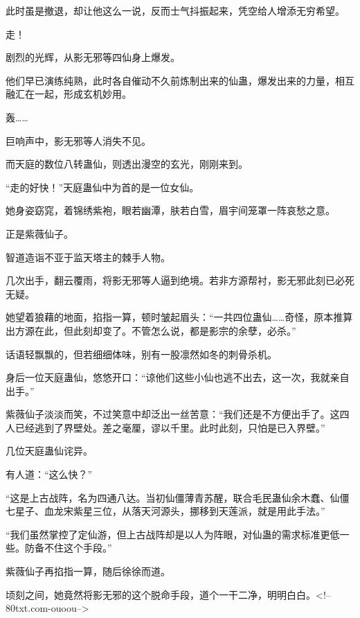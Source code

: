 \begin{this_body}
此时虽是撤退，却让他这么一说，反而士气抖振起来，凭空给人增添无穷希望。

走！

剧烈的光辉，从影无邪等四仙身上爆发。

他们早已演练纯熟，此时各自催动不久前炼制出来的仙蛊，爆发出来的力量，相互融汇在一起，形成玄机妙用。

轰……

巨响声中，影无邪等人消失不见。

而天庭的数位八转蛊仙，则透出漫空的玄光，刚刚来到。

“走的好快！”天庭蛊仙中为首的是一位女仙。

她身姿窈窕，着锦绣紫袍，眼若幽潭，肤若白雪，眉宇间笼罩一阵哀愁之意。

正是紫薇仙子。

智道造诣不亚于监天塔主的棘手人物。

几次出手，翻云覆雨，将影无邪等人逼到绝境。若非方源帮衬，影无邪此刻已必死无疑。

她望着狼藉的地面，掐指一算，顿时皱起眉头：“一共四位蛊仙……奇怪，原本推算出方源在此，但此刻却变了。不管怎么说，都是影宗的余孽，必杀。”

话语轻飘飘的，但若细细体味，别有一股凛然如冬的刺骨杀机。

身后一位天庭蛊仙，悠悠开口：“谅他们这些小仙也逃不出去，这一次，我就亲自出手。”

紫薇仙子淡淡而笑，不过笑意中却泛出一丝苦意：“我们还是不方便出手了。这四人已经逃到了界壁处。差之毫厘，谬以千里。此时此刻，只怕是已入界壁。”

几位天庭蛊仙诧异。

有人道：“这么快？”

“这是上古战阵，名为四通八达。当初仙僵薄青苏醒，联合毛民蛊仙余木蠢、仙僵七星子、血龙宋紫星三位，从落天河源头，挪移到天莲派，就是用此手法。”

“我们虽然掌控了定仙游，但上古战阵却是以人为阵眼，对仙蛊的需求标准更低一些。防备不住这个手段。”

紫薇仙子再掐指一算，随后徐徐而道。

顷刻之间，她竟然将影无邪的这个脱命手段，道个一干二净，明明白白。<!--80txt.com-ouoou-->

\end{this_body}

